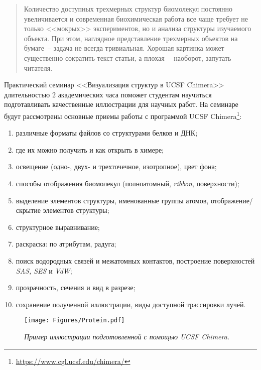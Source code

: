 \begin{abstract}
Количество доступных трехмерных структур биомолекул постоянно увеличивается и современная биохимическая работа все чаще требует не только <<мокрых>> экспериментов, но и анализа структуры изучаемого объекта. При этом, наглядное представление трехмерных объектов на бумаге~-- задача не всегда тривиальная. Хорошая картинка может существенно сократить текст статьи, а плохая~-- наоборот, запутать читателя. 
\end{abstract}

Практический семинар <<Визуализация структур в UCSF Chimera>> длительностью 2 академических часа поможет студентам научиться подготавливать качественные иллюстрации для научных работ. На семинаре будут рассмотрены основные приемы работы с программой UCSF Chimera\footnote{\url{https://www.cgl.ucsf.edu/chimera/}}:
\begin{enumerate}
    \item различные форматы файлов со структурами белков и ДНК; %
    \item где их можно получить и как открыть в химере; %
    \item освещение (одно-, двух- и трехточечное, изотропное), цвет фона; %
    \item способы отображения биомолекул (полноатомный, \textit{ribbon}, поверхности); %
    \item выделение элементов структуры, именованные группы атомов, отображение/скрытие элементов структуры; %
    \item структурное выравнивание; %
    \item раскраска: по атрибутам, радуга; %
    \item поиск водородных связей и межатомных контактов, построение поверхностей \textit{SAS, SES} и \textit{VdW}; %
    \item прозрачность, сечения и вид в разрезе; %
    \item сохранение полученной иллюстрации, виды доступной трассировки лучей.
\end{enumerate}
\hfill
\begin{figure}[h!]
  \texttt{[image: Figures/Protein.pdf]}
  \caption{\textit{Пример иллюстрации подготовленной с помощью UCSF Chimera.}}
  \label{fig:smug}
\end{figure}